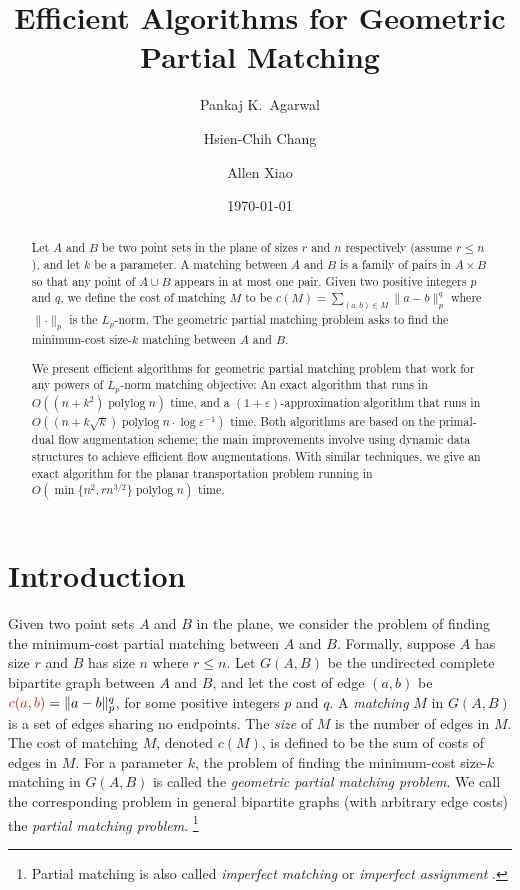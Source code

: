 \documentclass[a4paper,UKenglish,nolineno]{socg-lipics-v2019}
\title{Efficient Algorithms for Geometric Partial Matching}
\author{Pankaj K.\ Agarwal}{Duke University, Durham, USA}{pankaj@cs.duke.edu}{}{}
\author{Hsien-Chih Chang}{Duke University, Durham, USA}{hsienchih.chang@duke.edu}{}{}
\author{Allen Xiao}{Duke University, Durham, USA}{axiao@cs.duke.edu}{}{}
\date{\today}
\def\polylog{\mathop{\mathrm{polylog}}}
\def\eps{\varepsilon}
\def\norm#1{\mathopen\| #1 \mathclose\|}	%
\def\cost{c}
\def\EMPH#1{\textcolor{BrickRed}{{\emph{#1}}}}
\begin{document}
\maketitle

\begin{abstract}
Let $A$ and $B$ be two point sets in the plane of sizes $r$ and $n$ respectively (assume $r \leq n$), and let $k$ be a parameter.
A matching between $A$ and $B$ is a family of pairs in $A \times B$ so that any point of $A \cup B$ appears in at most one pair.
Given two positive integers $p$ and $q$, we define the cost of matching $M$ to be $\cost(M) = \sum_{(a, b) \in M}\norm{a-b}_p^q$ where $\norm{\cdot}_p$ is the $L_p$-norm.
The geometric partial matching problem asks to find the minimum-cost size-$k$ matching between $A$ and $B$.

We present efficient algorithms for geometric partial matching problem that work for any powers of $L_p$-norm matching objective:
An exact algorithm that runs in $O((n + k^2)\polylog n)$ time, and a $(1 + \eps)$-approximation algorithm that runs in $O((n + k\sqrt{k})\polylog n \cdot \log\eps^{-1})$ time.
Both algorithms are based on the primal-dual flow augmentation scheme; the main improvements involve using dynamic data structures to achieve efficient flow augmentations.
With similar techniques, we give an exact algorithm for the planar transportation problem running in $O(\min\{n^2, rn^{3/2}\}\polylog n)$ time.
\end{abstract}


\section{Introduction}

Given two point sets $A$ and $B$ in the plane, we consider the problem of finding
the minimum-cost partial matching between $A$ and $B$.
Formally, suppose $A$ has size $r$ and $B$ has size $n$ where $r \leq n$.
Let $G(A, B)$ be the undirected complete bipartite graph between
$A$ and $B$, and let the cost of edge $(a, b)$ be
$\EMPH{$c(a, b)$} = \norm{a-b}_p^q$, for some positive integers $p$ and $q$.
A \EMPH{matching} $M$ in $G(A, B)$ is a set of edges sharing no endpoints.
The \EMPH{size} of $M$ is the number of edges in $M$.
The cost of matching $M$, denoted \EMPH{$\cost(M)$}, is defined to be the sum of costs of edges in $M$.
For a parameter $k$, the problem of finding the minimum-cost
size-$k$ matching in $G(A, B)$ is called the \EMPH{geometric partial matching problem}.
We call the corresponding problem in general bipartite graphs (with arbitrary
edge costs) the \EMPH{partial matching problem}.%
\footnote{Partial matching is also called \EMPH{imperfect matching} or \EMPH{imperfect assignment} \cite{RT12,GHKT17}.}
\end{document}
